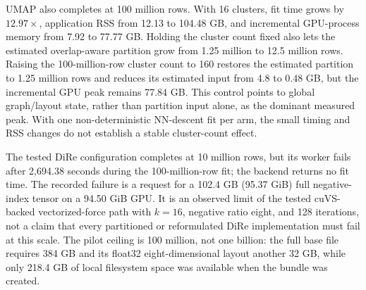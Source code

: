 \documentclass[10pt]{article}
\begin{document}
UMAP also completes at 100 million rows.  With 16 clusters, fit time grows by
$12.97\times$, application RSS from 12.13 to 104.48 GB, and incremental GPU-process
memory from 7.92 to 77.77 GB.  Holding the cluster count fixed also lets the estimated
overlap-aware partition grow from 1.25 million to 12.5 million rows.  Raising the
100-million-row cluster count to 160 restores the estimated partition to 1.25 million
rows and reduces its estimated input from 4.8 to 0.48 GB, but the incremental GPU peak
remains 77.84 GB.  This control points to global graph/layout state, rather than
partition input alone, as the dominant measured peak.  With one non-deterministic
NN-descent fit per arm, the small timing and RSS changes do not establish a stable
cluster-count effect.

The tested DiRe configuration completes at 10 million rows, but its worker fails after
2,694.38 seconds during the 100-million-row fit; the backend returns no fit time.  The
recorded failure is a request for a
102.4 GB (95.37 GiB) full negative-index tensor on a 94.50 GiB GPU.  It is an observed
limit of the tested cuVS-backed vectorized-force path with $k=16$, negative ratio eight,
and 128 iterations, not a claim that every partitioned or reformulated DiRe
implementation must fail at this scale.  The pilot ceiling is 100 million, not one
billion: the full base file requires 384 GB and its float32 eight-dimensional layout
another 32 GB, while only 218.4 GB of local filesystem space was available when the
bundle was created.
\end{document}
